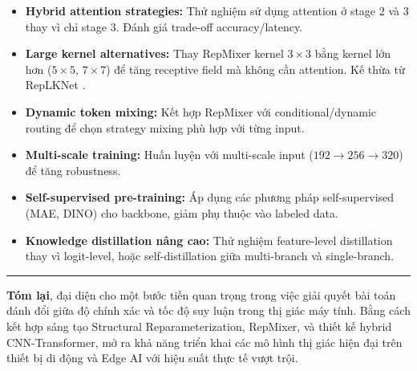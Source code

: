 \begin{itemize}
    \item \textbf{Hybrid attention strategies:} Thử nghiệm sử dụng attention ở stage 2 và 3 thay vì chỉ stage 3. Đánh giá trade-off accuracy/latency.
    
    \item \textbf{Large kernel alternatives:} Thay RepMixer kernel $3 \times 3$ bằng kernel lớn hơn ($5 \times 5$, $7 \times 7$) để tăng receptive field mà không cần attention. Kế thừa từ RepLKNet \cite{replknet2022}.
    
    \item \textbf{Dynamic token mixing:} Kết hợp RepMixer với conditional/dynamic routing để chọn strategy mixing phù hợp với từng input.
    
    \item \textbf{Multi-scale training:} Huấn luyện với multi-scale input ($192 \to 256 \to 320$) để tăng robustness.
    
    \item \textbf{Self-supervised pre-training:} Áp dụng các phương pháp self-supervised (MAE, DINO) cho \fastvit{} backbone, giảm phụ thuộc vào labeled data.
    
    \item \textbf{Knowledge distillation nâng cao:} Thử nghiệm feature-level distillation thay vì logit-level, hoặc self-distillation giữa multi-branch và single-branch.
\end{itemize}

\vspace{1cm}

\noindent\rule{\textwidth}{0.4pt}

\textbf{Tóm lại}, \fastvit{} đại diện cho một bước tiến quan trọng trong việc giải quyết bài toán đánh đổi giữa độ chính xác và tốc độ suy luận trong thị giác máy tính. Bằng cách kết hợp sáng tạo Structural Reparameterization, RepMixer, và thiết kế hybrid CNN-Transformer, \fastvit{} mở ra khả năng triển khai các mô hình thị giác hiện đại trên thiết bị di động và Edge AI với hiệu suất thực tế vượt trội.
